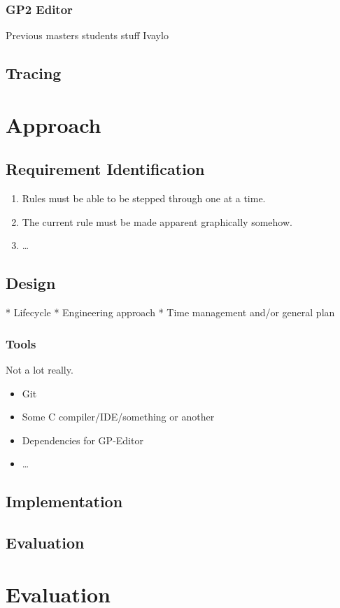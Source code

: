 \documentclass{UoYCSproject}
\begin{document}
\subsection{GP2 Editor}
Previous masters students stuff
Ivaylo
\section{Tracing}

\chapter{Approach}
\section{Requirement Identification}
\begin{enumerate}
  \item Rules must be able to be stepped through one at a time.
  \item The current rule must be made apparent graphically somehow.
  \item \ldots
\end{enumerate}
\section{Design}
 * Lifecycle
 * Engineering approach
 * Time management and/or general plan
 
\subsection{Tools}
Not a lot really.
\begin{itemize}
  \item Git
  \item Some C compiler/IDE/something or another
  \item Dependencies for GP-Editor
  \item \ldots
\end{itemize}
\section{Implementation}
\section{Evaluation}

\chapter{Evaluation}
\end{document}
